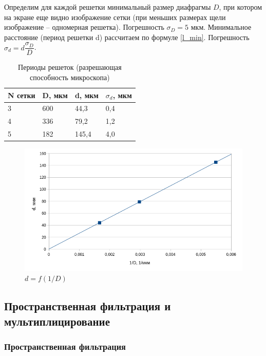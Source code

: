 \documentclass[a4paper, 12pt]{article}
\begin{document}
Определим для каждой решетки минимальный размер диафрагмы $D$, при котором на экране еще видно изображение сетки (при меньших размерах щели изображение -- одномерная решетка). Погрешность $\sigma_D  = 5$ мкм. Минимальное расстояние (период решетки d) рассчитаем по формуле \eqref{l_min}. Погрешность $\sigma_d = d \dfrac{\sigma_D}{D}$.

\begin{table}[h!] \label{Tab4}
\centering
\begin{tabular}{|l|l|l|l|}
\hline
N сетки & D, мкм & d, мкм & $\sigma_d$, мкм \\ \hline
3       & 600   & 44,3   & 0,4 \\ \hline
4       & 336    & 79,2  & 1,2 \\ \hline
5       & 182   & 145,4   & 4,0 \\ \hline
\end{tabular}
\caption{Периоды решеток (разрешающая способность микроскопа)}
\end{table}

\begin{figure}[h!]
\begin{center}
\includegraphics[width=1\textwidth]{График.png}
\end{center}
\caption{$d = f(1/D)$} \label{График}
\end{figure}

\newpage
\subsection*{Пространственная фильтрация и мультиплицирование}

\subsubsection*{Пространственная фильтрация}
\end{document}
